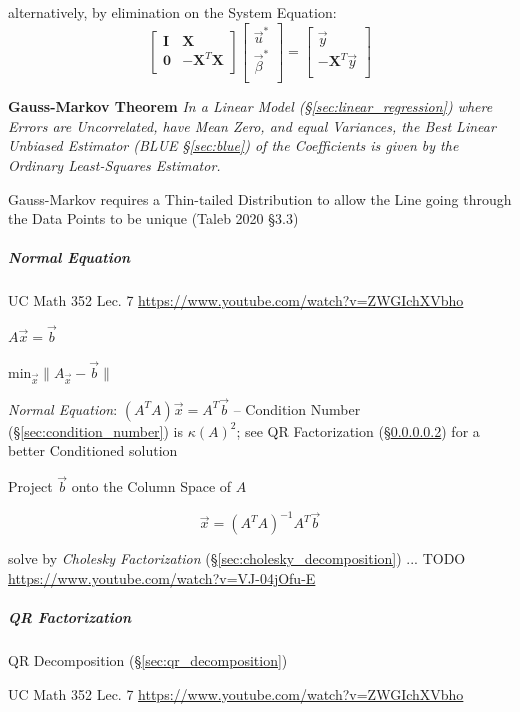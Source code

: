 alternatively, by elimination on the System Equation:
\[
  \begin{bmatrix}
    \mathbf{I} & \mathbf{X} \\
    \mathbf{0} & -\mathbf{X}^T\mathbf{X} \\
  \end{bmatrix} \begin{bmatrix}
    \vec{u}^*     \\
    \vec{\beta}^* \\
  \end{bmatrix} = \begin{bmatrix}
    \vec{y} \\
    -\mathbf{X}^T \vec{y} \\
  \end{bmatrix}
\]

\textbf{Gauss-Markov Theorem} \emph{
  In a Linear Model (\S\ref{sec:linear_regression}) where Errors are
  Uncorrelated, have Mean Zero, and equal Variances, the Best Linear Unbiased
  Estimator (BLUE \S\ref{sec:blue}) of the Coefficients is given by the Ordinary
  Least-Squares Estimator.
}

Gauss-Markov requires a Thin-tailed Distribution to allow the Line going
through the Data Points to be unique (Taleb 2020 \S 3.3)



\subparagraph{Normal Equation}\label{sec:normal_equation}\hfill

UC Math 352 Lec. 7 \url{https://www.youtube.com/watch?v=ZWGIchXVbho}

$A\vec{x} = \vec{b}$

$\mathrm{min}_{\vec{x}} \|A_{\vec{x}} - \vec{b}\|$

\emph{Normal Equation}: $(A^TA)\vec{x} = A^T\vec{b}$ -- Condition Number
(\S\ref{sec:condition_number}) is $\kappa(A)^2$; see QR Factorization
(\S\ref{sec:qr_factorization}) for a better Conditioned solution

Project $\vec{b}$ onto the Column Space of $A$

\[
  \vec{x} = (A^TA)^{-1}A^T\vec{b}
\]

solve by \emph{Cholesky Factorization} (\S\ref{sec:cholesky_decomposition}) ...
TODO \url{https://www.youtube.com/watch?v=VJ-04jOfu-E}



\subparagraph{QR Factorization}\label{sec:qr_factorization}\hfill

QR Decomposition (\S\ref{sec:qr_decomposition})

UC Math 352 Lec. 7 \url{https://www.youtube.com/watch?v=ZWGIchXVbho}

